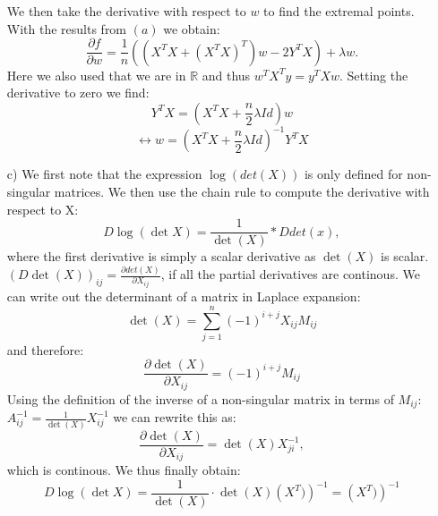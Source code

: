 \documentclass[10pt]{article}
\numberwithin{equation}{section}
\begin{document}
\begin{enumerate}
{$$$$
We then take the derivative with respect to $w$ to find the extremal points. With the results from $(a)$ we obtain:
$$
\frac{\partial f}{\partial w}=\frac{1}{n}( (X^TX + {(X^TX)}^T) w - 2Y^TX) + \lambda w.
$$
Here we also used that we are in $\mathbb{R}$ and thus $w^T X^Ty = y^TXw$. 
Setting the derivative to zero we find:
$$
Y^TX = \left( X^TX + \frac{n}{2}\lambda Id \right) w 
$$
$$
\leftrightarrow w = \left( X^TX + \frac{n}{2}\lambda Id \right)^{-1} Y^TX
$$}
\item[c)] {
We first note that the expression $\log(det(X))$ is only defined for non-singular matrices.
We then use the chain rule to compute the derivative with respect to X:
$$D \log(\det{X}) = \frac{1}{\det(X)} * D det(x),$$
where the first derivative is simply a scalar derivative as $\det(X)$ is scalar.
$\left(D \det(X)\right)_{ij} = \frac{\partial det(X)}{\partial X_{ij}}$, if all the partial derivatives are continous.
We can write out the determinant of a matrix in Laplace expansion:
$$
\det(X)= \sum_{j=1}^n (-1)^{i+j} X_{ij} M_{ij}
$$
and therefore:
$$
\frac{\partial \det(X)}{\partial X_{ij}} = (-1)^{i+j} M_{ij}
$$
Using the definition of the inverse of a non-singular matrix in terms of $M_{ij}$: $A^{-1}_{ij}= \frac{1}{\det(X)} X^{-1}_{ij}$ we can rewrite this as: 
$$
\frac{\partial \det(X)}{\partial X_{ij}} = \det(X) X^{-1}_{ji},
$$
which is continous. 
We thus finally obtain:
$$
D \log(\det{X}) = \frac{1}{\det(X)} \cdot \det(X) \left(X^T)\right)^{-1} =\left(X^T)\right)^{-1}  $$
}
\end{enumerate}
\end{document}
